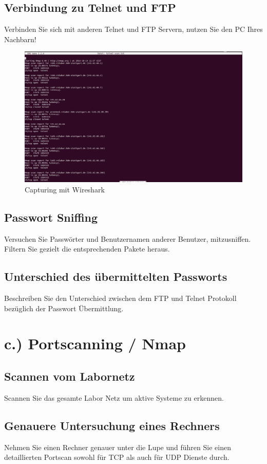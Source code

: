 \documentclass[a4paper]{report}
\begin{document}
\subsection{Verbindung zu Telnet und FTP}
Verbinden Sie sich mit anderen Telnet und FTP Servern, nutzen Sie den PC Ihres Nachbarn!

\begin{figure}[htb]
	\centering
		\includegraphics[width=1.25\textwidth]{laborergebnisse/screenshots/b_1.png}
	\caption{Capturing mit Wireshark}
	\label{fig:capturingwireshark1}
\end{figure}


\newpage
\subsection{Passwort Sniffing}
Versuchen Sie Passwörter und Benutzernamen anderer Benutzer, mitzusniffen. Filtern Sie gezielt die entsprechenden Pakete heraus.

\newpage
\subsection{Unterschied des übermittelten Passworts}
Beschreiben Sie den Unterschied zwischen dem FTP und Telnet Protokoll bezüglich der Passwort Übermittlung.

\section{c.) Portscanning / Nmap}
\subsection{Scannen vom Labornetz}
Scannen Sie das gesamte Labor Netz um aktive Systeme zu erkennen.
\subsection{Genauere Untersuchung eines Rechners}
Nehmen Sie einen Rechner genauer unter die Lupe und führen Sie einen detaillierten Portscan sowohl für TCP als auch für UDP Dienste durch.
\end{document}
